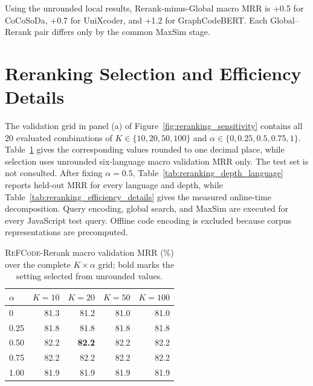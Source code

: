 \documentclass[11pt]{article}
\newcommand{\method}{\textsc{ReFCode}}
\begin{document}
Using the unrounded local results, Rerank-minus-Global macro MRR is +0.5 for CoCoSoDa, +0.7 for UniXcoder, and +1.2 for GraphCodeBERT. Each Global--Rerank pair differs only by the common MaxSim stage.

\section{Reranking Selection and Efficiency Details}
\label{app:reranking_details}

The validation grid in panel (a) of Figure~\ref{fig:reranking_sensitivity} contains all 20 evaluated combinations of \(K\in\{10,20,50,100\}\) and \(\alpha\in\{0,0.25,0.5,0.75,1\}\). Table~\ref{tab:reranking_validation_grid} gives the corresponding values rounded to one decimal place, while selection uses unrounded six-language macro validation MRR only. The test set is not consulted. After fixing \(\alpha=0.5\), Table~\ref{tab:reranking_depth_language} reports held-out MRR for every language and depth, while Table~\ref{tab:reranking_efficiency_details} gives the measured online-time decomposition. Query encoding, global search, and MaxSim are executed for every JavaScript test query. Offline code encoding is excluded because corpus representations are precomputed.

\begin{table}[!t]
  \centering
  \captionsetup{skip=2pt}
  \scriptsize
  \setlength{\tabcolsep}{2.2pt}
  \renewcommand{\arraystretch}{0.92}
  \begin{tabular*}{\columnwidth}{@{\extracolsep{\fill}}lrrrr@{}}
    \toprule
    \(\alpha\) & \(K=10\) & \(K=20\) & \(K=50\) & \(K=100\) \\
    \midrule
    0    & 81.3 & 81.2 & 81.0 & 81.0 \\
    0.25 & 81.8 & 81.8 & 81.8 & 81.8 \\
    0.50 & 82.2 & \textbf{82.2} & 82.2 & 82.2 \\
    0.75 & 82.2 & 82.2 & 82.2 & 82.2 \\
    1.00 & 81.9 & 81.9 & 81.9 & 81.9 \\
    \bottomrule
  \end{tabular*}
  \caption{\method{}-Rerank macro validation MRR (\%) over the complete \(K\times\alpha\) grid; bold marks the setting selected from unrounded values.}
  \label{tab:reranking_validation_grid}
\end{table}
\end{document}
